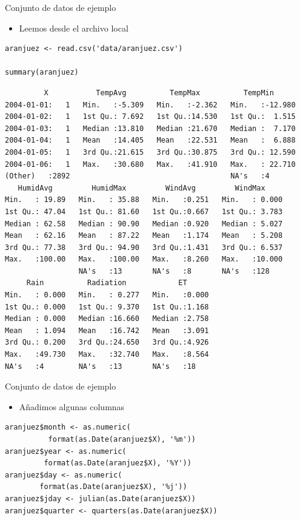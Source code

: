 \documentclass[xcolor={usenames,svgnames,dvipsnames}]{beamer}
\begin{document}
\begin{frame}[fragile,label=sec-1-1-2]{Conjunto de datos de ejemplo}
 \begin{itemize}
\item Leemos desde el archivo local
\end{itemize}
\lstset{language=R,numbers=none}
\begin{lstlisting}
aranjuez <- read.csv('data/aranjuez.csv')

summary(aranjuez)
\end{lstlisting}

\begin{verbatim}
         X           TempAvg          TempMax          TempMin       
2004-01-01:   1   Min.   :-5.309   Min.   :-2.362   Min.   :-12.980  
2004-01-02:   1   1st Qu.: 7.692   1st Qu.:14.530   1st Qu.:  1.515  
2004-01-03:   1   Median :13.810   Median :21.670   Median :  7.170  
2004-01-04:   1   Mean   :14.405   Mean   :22.531   Mean   :  6.888  
2004-01-05:   1   3rd Qu.:21.615   3rd Qu.:30.875   3rd Qu.: 12.590  
2004-01-06:   1   Max.   :30.680   Max.   :41.910   Max.   : 22.710  
(Other)   :2892                                     NA's   :4        
   HumidAvg         HumidMax         WindAvg         WindMax      
Min.   : 19.89   Min.   : 35.88   Min.   :0.251   Min.   : 0.000  
1st Qu.: 47.04   1st Qu.: 81.60   1st Qu.:0.667   1st Qu.: 3.783  
Median : 62.58   Median : 90.90   Median :0.920   Median : 5.027  
Mean   : 62.16   Mean   : 87.22   Mean   :1.174   Mean   : 5.208  
3rd Qu.: 77.38   3rd Qu.: 94.90   3rd Qu.:1.431   3rd Qu.: 6.537  
Max.   :100.00   Max.   :100.00   Max.   :8.260   Max.   :10.000  
                 NA's   :13       NA's   :8       NA's   :128     
     Rain          Radiation            ET       
Min.   : 0.000   Min.   : 0.277   Min.   :0.000  
1st Qu.: 0.000   1st Qu.: 9.370   1st Qu.:1.168  
Median : 0.000   Median :16.660   Median :2.758  
Mean   : 1.094   Mean   :16.742   Mean   :3.091  
3rd Qu.: 0.200   3rd Qu.:24.650   3rd Qu.:4.926  
Max.   :49.730   Max.   :32.740   Max.   :8.564  
NA's   :4        NA's   :13       NA's   :18
\end{verbatim}
\end{frame}
\begin{frame}[fragile,label=sec-1-1-3]{Conjunto de datos de ejemplo}
 \begin{itemize}
\item Añadimos algunas columnas
\end{itemize}
\lstset{language=R,numbers=none}
\begin{lstlisting}
aranjuez$month <- as.numeric(
		  format(as.Date(aranjuez$X), '%m'))
aranjuez$year <- as.numeric(
		 format(as.Date(aranjuez$X), '%Y'))
aranjuez$day <- as.numeric(
		format(as.Date(aranjuez$X), '%j'))
aranjuez$jday <- julian(as.Date(aranjuez$X))
aranjuez$quarter <- quarters(as.Date(aranjuez$X))
\end{lstlisting}
\end{frame}
\end{document}
